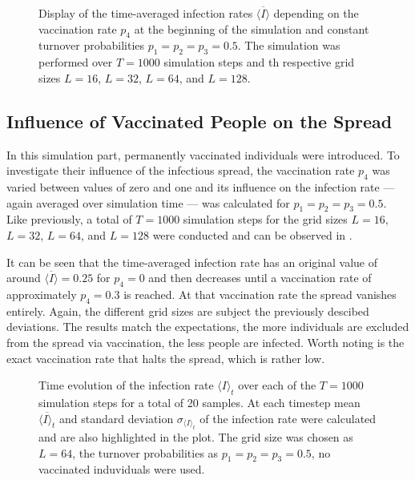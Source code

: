 \begin{figure}[ht]
    \centering
    \resizebox{\textwidth}{!}{}
    \caption{Display of the time-averaged infection rates $\overline{\langle I\rangle}$ depending on the vaccination rate $p_4$ at the beginning of the simulation and constant turnover probabilities
    $p_1=p_2=p_3=0.5$. The simulation was performed over $T=1000$ simulation steps and th respective grid sizes $L=16$, $L=32$, $L=64$, and $L=128$.}\label{fig:res_dis_avg_inf_over_p4}
\end{figure}


\subsection{Influence of Vaccinated People on the Spread}

In this simulation part, permanently vaccinated individuals \vaccinated{} were introduced. To investigate their influence of the infectious spread, the vaccination rate $p_4$ was varied between values of zero and one
and its influence on the infection rate --- again averaged over simulation time --- was calculated for $p_1=p_2=p_3=0.5$. Like previously, a total of $T=1000$ simulation steps for the grid sizes 
$L=16$, $L=32$, $L=64$, and $L=128$ were conducted and can be observed in . 

It can be seen that the time-averaged infection rate has an original value of around $\overline{\langle I\rangle}=0.25$ for $p_4=0$ and then decreases until a vaccination rate of approximately $p_4=0.3$ is reached.
At that vaccination rate the spread vanishes entirely. Again, the different grid sizes are subject the previously descibed deviations. 
The results match the expectations, the more individuals are excluded from the spread via vaccination, the less people are infected. 
Worth noting is the exact vaccination rate that halts the spread, which is rather low.

\begin{figure}[ht]
    \centering
    \resizebox{\textwidth}{!}{}
    \caption{Time evolution of the infection rate $\langle I\rangle_t$ over each of the $T=1000$ simulation steps for a total of 20 samples. At each timestep mean $\overline{\langle I\rangle_t}$
    and standard deviation $\sigma_{\langle I\rangle_t}$ of the infection rate were calculated and are also highlighted in the plot. The grid size was chosen as $L=64$, the turnover probabilities
    as $p_1=p_2=p_3=0.5$, no vaccinated induviduals were used.}\label{fig:res_dis_avg_inf_over_t}
\end{figure}



